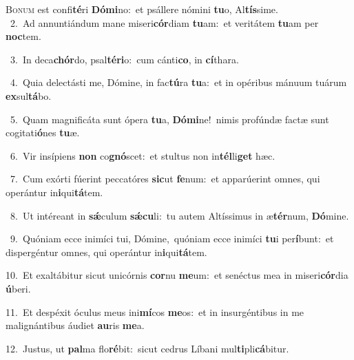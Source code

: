 \lettrine{\initial\textcolor{\initialcolor}{B}}{onum} est confi\-\textbf{té}\-ri \textbf{Dó}\-\textbf{mi}no:~\star et psállere nómini \textbf{tu}\-o, Al\-\textbf{tís}\-sime.\\
{\numbfont\textcolor{\numbcolor}{~2.}}~Ad annuntiándum mane miseri\-\textbf{cór}\-diam \textbf{tu}\-am:~\star et veritátem \textbf{tu}\-am per \textbf{noc}\-tem.\par
{\numbfont\textcolor{\numbcolor}{~3.}}~In deca\-\textbf{chór}\-do, psal\-\textbf{té}\-\textbf{ri}o:~\star cum cánti\-\textbf{co}\-, in \textbf{cí}\-thara.\par
{\numbfont\textcolor{\numbcolor}{~4.}}~Quia delectásti me, Dómine, in fac\-\textbf{tú}\-ra \textbf{tu}\-a:~\star et in opéribus mánuum tuárum \textbf{ex}\-sul\-\textbf{tá}\-bo.\par
{\numbfont\textcolor{\numbcolor}{~5.}}~Quam magnificáta sunt ópera \textbf{tu}\-a, \textbf{Dó}\-\textbf{mi}ne!~\star nimis profúndæ factæ sunt cogitati\-\textbf{ó}\-nes \textbf{tu}\-æ.\par
{\numbfont\textcolor{\numbcolor}{~6.}}~Vir insípiens \textbf{non} co\-\textbf{gnó}\-scet:~\star et stultus non in\-\textbf{tél}\-li\textbf{get} hæc.\par
{\numbfont\textcolor{\numbcolor}{~7.}}~Cum exórti fúerint peccatóres \textbf{sic}\-ut \textbf{fe}\-num:~\star et apparúerint omnes, qui operántur in\-\textbf{i}\-qui\-\textbf{tá}\-tem.\par
{\numbfont\textcolor{\numbcolor}{~8.}}~Ut intéreant in \textbf{sǽ}\-culum \textbf{sǽ}\-\textbf{cu}li:~\star tu autem Altíssimus in æ\-\textbf{tér}\-num, \textbf{Dó}\-mine.\par
{\numbfont\textcolor{\numbcolor}{~9.}}~Quóniam ecce inimíci tui, Dómine,~\dagger quóniam ecce inimíci \textbf{tu}\-i per\-\textbf{í}\-bunt:~\star et dispergéntur omnes, qui operántur in\-\textbf{i}\-qui\-\textbf{tá}\-tem.\par
{\numbfont\textcolor{\numbcolor}{10.}}~Et exaltábitur sicut unicórnis \textbf{cor}\-nu \textbf{me}\-um:~\star et senéctus mea in miseri\-\textbf{cór}\-dia \textbf{ú}\-beri.\par
{\numbfont\textcolor{\numbcolor}{11.}}~Et despéxit óculus meus ini\-\textbf{mí}\-cos \textbf{me}\-os:~\star et in insurgéntibus in me malignántibus áudiet \textbf{au}\-ris \textbf{me}\-a.\par
{\numbfont\textcolor{\numbcolor}{12.}}~Justus, ut \textbf{pal}\-ma flo\-\textbf{ré}\-bit:~\star sicut cedrus Líbani mul\-\textbf{ti}\-pli\-\textbf{cá}\-bitur.\par
